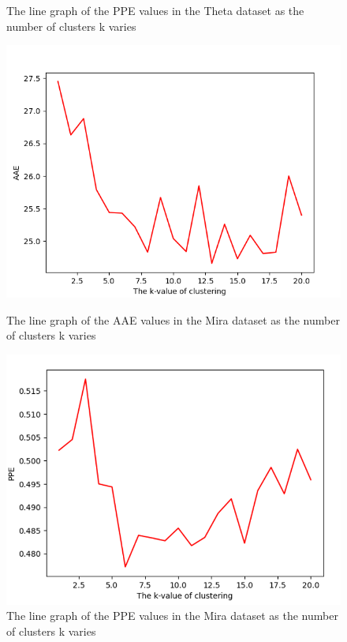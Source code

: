 \documentclass[conference,compsoc]{IEEEtran}
\begin{document}
\begin{figure}[H]
\begin{minipage}[t]{0.45\linewidth}
		\caption{The line graph of the PPE values in the Theta dataset as the number of clusters k varies}
		\label{Fig:PPEInTheta}
	\end{minipage} 
\end{figure}

\begin{figure}[H]
	\begin{minipage}[t]{0.45\linewidth}
		\includegraphics[width=\linewidth]{AAEInMira.png} 
		\caption{The line graph of the AAE values in the Mira dataset as the number of clusters k varies} 
		\label{Fig:AAEInMira}
	\end{minipage}%
	\hfill%
	\begin{minipage}[t]{0.45\linewidth}
		\includegraphics[width=\linewidth]{PPEInMira.png}
		\caption{The line graph of the PPE values in the Mira dataset as the number of clusters k varies}
		\label{Fig:PPEInMira}
	\end{minipage} 
\end{figure}
\end{document}
